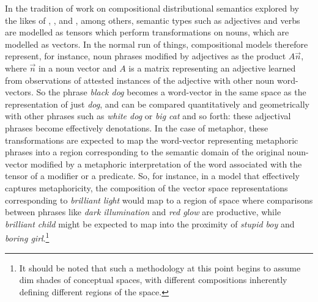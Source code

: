 In the tradition of work on compositional distributional semantics explored by the likes of \cite{MitchellEA2010}, \cite{BaroniEA2010}, and \cite{CoeckeEA2011}, among others, semantic types such as adjectives and verbs are modelled as tensors which perform transformations on nouns, which are modelled as vectors.  In the normal run of things, compositional models therefore represent, for instance, noun phrases modified by adjectives as the product $A\overrightarrow{n}$, where $\overrightarrow{n}$ in a noun vector and $A$ is a matrix representing an adjective learned from observations of attested instances of the adjective with other noun word-vectors.  So the phrase \emph{black dog} becomes a word-vector in the same space as the representation of just \emph{dog}, and can be compared quantitatively and geometrically with other phrases such as \emph{white dog} or \emph{big cat} and so forth: these adjectival phrases become effectively denotations.  In the case of metaphor, these transformations are expected to map the word-vector representing metaphoric phrases into a region corresponding to the semantic domain of the original noun-vector modified by a metaphoric interpretation of the word associated with the tensor of a modifier or a predicate.  So, for instance, in a model that effectively captures metaphoricity, the composition of the vector space representations corresponding to \emph{brilliant light} would map to a region of space where comparisons between phrases like \emph{dark illumination} and \emph{red glow} are productive, while \emph{brilliant child} might be expected to map into the proximity of \emph{stupid boy} and \emph{boring girl}.\footnote{It should be noted that such a methodology at this point begins to assume dim shades of  conceptual spaces, with different compositions inherently defining different regions of the space.}

